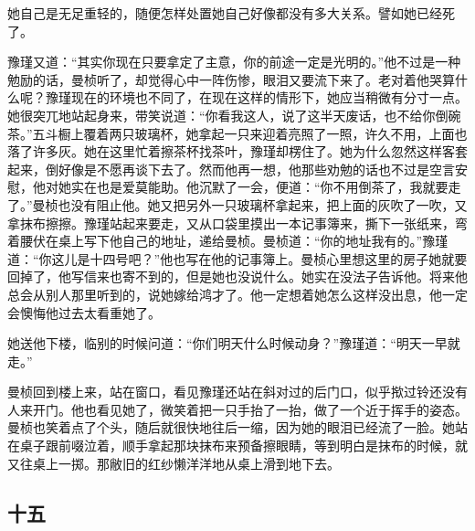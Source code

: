 \par 她自己是无足重轻的，随便怎样处置她自己好像都没有多大关系。譬如她已经死了。
\par 豫瑾又道：“其实你现在只要拿定了主意，你的前途一定是光明的。”他不过是一种勉励的话，曼桢听了，却觉得心中一阵伤惨，眼泪又要流下来了。老对着他哭算什么呢？豫瑾现在的环境也不同了，在现在这样的情形下，她应当稍微有分寸一点。她很突兀地站起身来，带笑说道：“你看我这人，说了这半天废话，也不给你倒碗茶。”五斗橱上覆着两只玻璃杯，她拿起一只来迎着亮照了一照，许久不用，上面也落了许多灰。她在这里忙着擦茶杯找茶叶，豫瑾却楞住了。她为什么忽然这样客套起来，倒好像是不愿再谈下去了。然而他再一想，他那些劝勉的话也不过是空言安慰，他对她实在也是爱莫能助。他沉默了一会，便道：“你不用倒茶了，我就要走了。”曼桢也没有阻止他。她又把另外一只玻璃杯拿起来，把上面的灰吹了一吹，又拿抹布擦擦。豫瑾站起来要走，又从口袋里摸出一本记事簿来，撕下一张纸来，弯着腰伏在桌上写下他自己的地址，递给曼桢。曼桢道：“你的地址我有的。”豫瑾道：“你这儿是十四号吧？”他也写在他的记事簿上。曼桢心里想这里的房子她就要回掉了，他写信来也寄不到的，但是她也没说什么。她实在没法子告诉他。将来他总会从别人那里听到的，说她嫁给鸿才了。他一定想着她怎么这样没出息，他一定会懊悔他过去太看重她了。
\par 她送他下楼，临别的时候问道：“你们明天什么时候动身？”豫瑾道：“明天一早就走。”
\par 曼桢回到楼上来，站在窗口，看见豫瑾还站在斜对过的后门口，似乎揿过铃还没有人来开门。他也看见她了，微笑着把一只手抬了一抬，做了一个近于挥手的姿态。曼桢也笑着点了个头，随后就很快地往后一缩，因为她的眼泪已经流了一脸。她站在桌子跟前啜泣着，顺手拿起那块抹布来预备擦眼睛，等到明白是抹布的时候，就又往桌上一掷。那敝旧的红纱懒洋洋地从桌上滑到地下去。

\subsection{十五}

